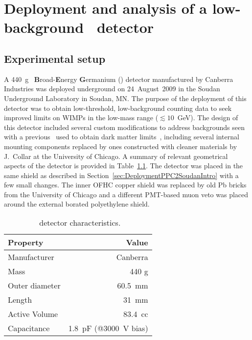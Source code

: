 \chapter{Deployment and analysis of a low-background \bege~detector}
\label{chap:AnalysisBeGe}
	\section{Experimental setup}
	\label{sec:BeGeExperimentalSetup}

A 440~g \ppc~\textbf{B}road-\textbf{E}nergy \textbf{G}ermanium (\bege) detector manufactured by Canberra Industries was deployed underground on 24~August~2009 in the Soudan Underground Laboratory in Soudan, MN.  The purpose of the deployment of this detector was to obtain low-threshold, low-background counting data to seek improved limits on WIMPs in the low-mass range ($\lesssim10$~GeV).  The design of this detector included several custom modifications to address backgrounds seen with a previous \ppc~used to obtain dark matter limits~\cite{Aalseth:2008aa}, including several internal mounting components replaced by ones constructed with cleaner materials by J.~Collar at the University of Chicago.  A summary of relevant geometrical aspects of the detector is provided in Table~\ref{tab:BEGeCharacteristics}.
The detector was placed in the same shield as described in Section~\ref{sec:DeploymentPPC2SoudanIntro} with a few small changes.  The inner OFHC copper shield was replaced by old Pb bricks from the University of Chicago and a different PMT-based muon veto was placed around the external borated polyethylene shield.   %

			\begin{table}
				\centering
				\begin{tabular}{l r}
					\toprule
					Property & Value \\
					\midrule
					Manufacturer & Canberra \\
					Mass & 440 g \\
					Outer diameter &  60.5~mm\\
					Length &  31~mm\\
					Active Volume & 83.4~cc \\
					Capacitance & 1.8~pF (@3000~V bias) \\

					\bottomrule
				\end{tabular}
				\caption[\bege~detector characteristics]
				{\bege~detector characteristics.  }
				\label{tab:BEGeCharacteristics}
			\end{table}

